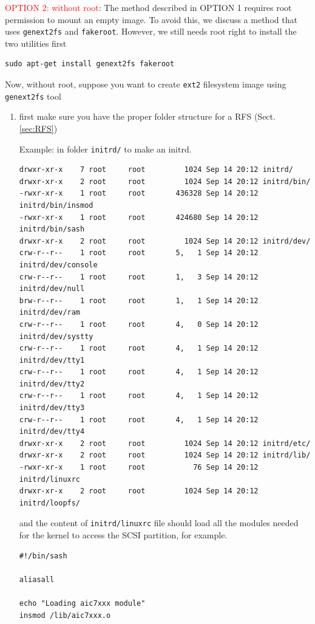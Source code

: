 \textcolor{red}{OPTION 2: without root}:
The method described in OPTION 1 requires root permission to mount an empty
image. To avoid this, we discuss a method that uses \verb!genext2fs! and
\verb!fakeroot!. However, we still needs root right to install the two utilities
first
\begin{verbatim}
sudo apt-get install genext2fs fakeroot
\end{verbatim}

Now, without root, suppose you want to create \verb!ext2! filesystem image using
\verb!genext2fs! tool
\begin{enumerate}
  \item first make sure you have the proper folder structure for a RFS
  (Sect.\ref{sec:RFS})

Example: in folder \verb!initrd/! to make an initrd.
\begin{verbatim}
drwxr-xr-x    7 root     root         1024 Sep 14 20:12 initrd/
drwxr-xr-x    2 root     root         1024 Sep 14 20:12 initrd/bin/
-rwxr-xr-x    1 root     root       436328 Sep 14 20:12 initrd/bin/insmod
-rwxr-xr-x    1 root     root       424680 Sep 14 20:12 initrd/bin/sash
drwxr-xr-x    2 root     root         1024 Sep 14 20:12 initrd/dev/
crw-r--r--    1 root     root       5,   1 Sep 14 20:12 initrd/dev/console
crw-r--r--    1 root     root       1,   3 Sep 14 20:12 initrd/dev/null
brw-r--r--    1 root     root       1,   1 Sep 14 20:12 initrd/dev/ram
crw-r--r--    1 root     root       4,   0 Sep 14 20:12 initrd/dev/systty
crw-r--r--    1 root     root       4,   1 Sep 14 20:12 initrd/dev/tty1
crw-r--r--    1 root     root       4,   1 Sep 14 20:12 initrd/dev/tty2
crw-r--r--    1 root     root       4,   1 Sep 14 20:12 initrd/dev/tty3
crw-r--r--    1 root     root       4,   1 Sep 14 20:12 initrd/dev/tty4
drwxr-xr-x    2 root     root         1024 Sep 14 20:12 initrd/etc/
drwxr-xr-x    2 root     root         1024 Sep 14 20:12 initrd/lib/
-rwxr-xr-x    1 root     root           76 Sep 14 20:12 initrd/linuxrc
drwxr-xr-x    2 root     root         1024 Sep 14 20:12 initrd/loopfs/
\end{verbatim}
and the content of \verb!initrd/linuxrc! file should load all the modules needed
for the kernel to access the SCSI partition, for example.
\begin{verbatim}
#!/bin/sash
 
aliasall
 
echo "Loading aic7xxx module"
insmod /lib/aic7xxx.o 
\end{verbatim}


\end{enumerate}
